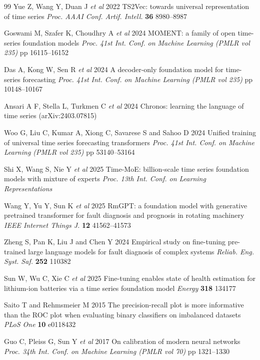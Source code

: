 \documentclass{iopjournal}
\begin{document}
\begin{thebibliography}{99}
 Yue Z, Wang Y, Duan J \textit{et al} 2022 TS2Vec: towards universal representation of time series \textit{Proc. AAAI Conf. Artif. Intell.} \textbf{36} 8980--8987

 Goswami M, Szafer K, Choudhry A \textit{et al} 2024 MOMENT: a family of open time-series foundation models \textit{Proc. 41st Int. Conf. on Machine Learning (PMLR vol 235)} pp 16115--16152

 Das A, Kong W, Sen R \textit{et al} 2024 A decoder-only foundation model for time-series forecasting \textit{Proc. 41st Int. Conf. on Machine Learning (PMLR vol 235)} pp 10148--10167

 Ansari A F, Stella L, Turkmen C \textit{et al} 2024 Chronos: learning the language of time series (arXiv:2403.07815)

 Woo G, Liu C, Kumar A, Xiong C, Savarese S and Sahoo D 2024 Unified training of universal time series forecasting transformers \textit{Proc. 41st Int. Conf. on Machine Learning (PMLR vol 235)} pp 53140--53164

 Shi X, Wang S, Nie Y \textit{et al} 2025 Time-MoE: billion-scale time series foundation models with mixture of experts \textit{Proc. 13th Int. Conf. on Learning Representations}

 Wang Y, Yu Y, Sun K \textit{et al} 2025 RmGPT: a foundation model with generative pretrained transformer for fault diagnosis and prognosis in rotating machinery \textit{IEEE Internet Things J.} \textbf{12} 41562--41573

 Zheng S, Pan K, Liu J and Chen Y 2024 Empirical study on fine-tuning pre-trained large language models for fault diagnosis of complex systems \textit{Reliab. Eng. Syst. Saf.} \textbf{252} 110382

 Sun W, Wu C, Xie C \textit{et al} 2025 Fine-tuning enables state of health estimation for lithium-ion batteries via a time series foundation model \textit{Energy} \textbf{318} 134177

 Saito T and Rehmsmeier M 2015 The precision-recall plot is more informative than the ROC plot when evaluating binary classifiers on imbalanced datasets \textit{PLoS One} \textbf{10} e0118432

 Guo C, Pleiss G, Sun Y \textit{et al} 2017 On calibration of modern neural networks \textit{Proc. 34th Int. Conf. on Machine Learning (PMLR vol 70)} pp 1321--1330


\end{thebibliography}
\end{document}
